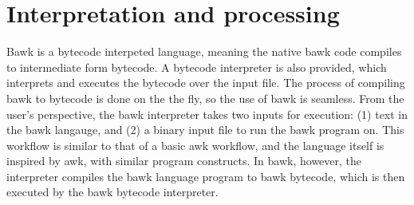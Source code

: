 \documentclass[letterpaper]{article}
\begin{document}
\section{Interpretation and processing}
\label{sec:interpretation}
Bawk is a bytecode interpeted language, meaning the native bawk code compiles to intermediate form bytecode.  A bytecode interpreter is also provided, which interprets and executes the bytecode over the input file.  The process of compiling bawk to bytecode is done on the the fly, so the use of bawk is seamless.  From the user's perspective, the bawk interpreter takes two inputs for execution: (1) text in the bawk langauge, and (2) a binary input file to run the bawk program on.  This workflow is similar to that of a basic awk workflow, and the language itself is inspired by awk, with similar program constructs.  In bawk, however, the interpreter compiles the bawk language program to bawk bytecode, which is then executed by the bawk bytecode interpreter.
\end{document}
